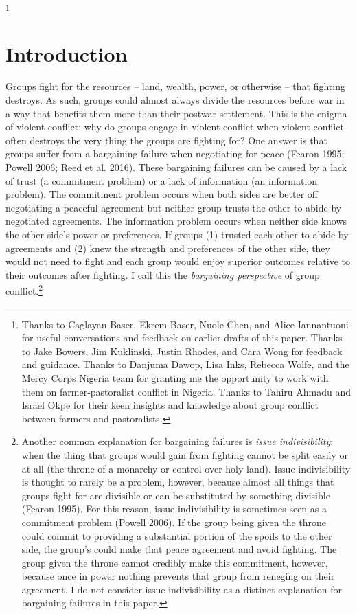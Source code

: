 \documentclass[11pt]{article}
\begin{document}
\newcommand\blfootnote[1]{%
  \begingroup
  \renewcommand\thefootnote{}\footnote{#1}%
  \addtocounter{footnote}{-1}%
  \endgroup
}
\singlespacing\blfootnote{Thanks to Caglayan Baser, Ekrem Baser, Nuole Chen, and Alice Iannantuoni
for useful conversations and feedback on earlier drafts of this paper.
Thanks to Jake Bowers, Jim Kuklinski, Justin Rhodes, and Cara Wong for
feedback and guidance. Thanks to Danjuma Dawop, Lisa Inks, Rebecca
Wolfe, and the Mercy Corps Nigeria team for granting me the opportunity
to work with them on farmer-pastoralist conflict in Nigeria. Thanks to
Tahiru Ahmadu and Israel Okpe for their keen insights and knowledge
about group conflict between farmers and pastoralists.}

\newpage

\hypertarget{introduction}{%
\section{Introduction}\label{introduction}}

Groups fight for the resources -- land, wealth, power, or otherwise --
that fighting destroys. As such, groups could almost always divide the
resources before war in a way that benefits them more than their postwar
settlement. This is the enigma of violent conflict: why do groups engage
in violent conflict when violent conflict often destroys the very thing
the groups are fighting for? One answer is that groups suffer from a
bargaining failure when negotiating for peace (Fearon 1995; Powell 2006;
Reed et al. 2016). These bargaining failures can be caused by a lack of
trust (a commitment problem) or a lack of information (an information
problem). The commitment problem occurs when both sides are better off
negotiating a peaceful agreement but neither group trusts the other to
abide by negotiated agreements. The information problem occurs when
neither side knows the other side's power or preferences. If groups (1)
trusted each other to abide by agreements and (2) knew the strength and
preferences of the other side, they would not need to fight and each
group would enjoy superior outcomes relative to their outcomes after
fighting. I call this the \emph{bargaining perspective} of group
conflict.\footnote{Another common explanation for bargaining failures is
  \emph{issue indivisibility}: when the thing that groups would gain
  from fighting cannot be split easily or at all (the throne of a
  monarchy or control over holy land). Issue indivisibility is thought
  to rarely be a problem, however, because almost all things that groups
  fight for are divisible or can be substituted by something divisible
  (Fearon 1995). For this reason, issue indivisibility is sometimes seen
  as a commitment problem (Powell 2006). If the group being given the
  throne could commit to providing a substantial portion of the spoils
  to the other side, the group's could make that peace agreement and
  avoid fighting. The group given the throne cannot credibly make this
  commitment, however, because once in power nothing prevents that group
  from reneging on their agreement. I do not consider issue
  indivisibility as a distinct explanation for bargaining failures in
  this paper.}
\end{document}

